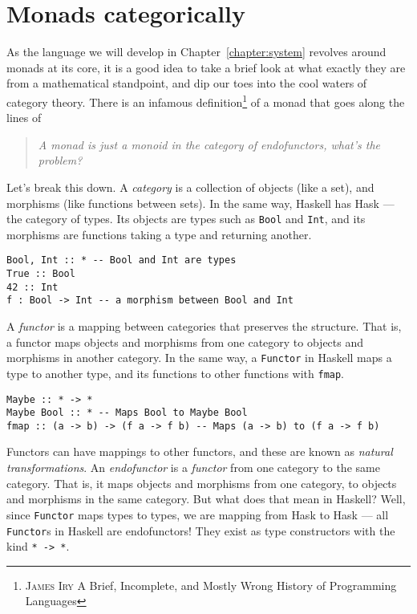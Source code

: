 \section{Monads categorically}
As the language we will develop in Chapter~\ref{chapter:system}
revolves around monads at its core, it is a good idea to take a brief
look at what exactly they are from a mathematical standpoint, and dip
our toes into the cool waters of category theory. There is an infamous
definition\footnote{\textsc{James Iry} A Brief, Incomplete, and Mostly
  Wrong History of Programming Languages} of a monad that goes along
the lines of
\begin{quote}
  \textsl{A monad is just a monoid in the category of endofunctors,
    what's the problem?}
\end{quote}
Let's break this down. A \textit{category} is a collection of objects
(like a set), and morphisms (like functions between sets). In the same
way, Haskell has \textsf{Hask} --- the category of types. Its objects
are types such as \texttt{Bool} and
\texttt{Int}, and its morphisms are functions taking a
type and returning another.
\begin{verbatim}
Bool, Int :: * -- Bool and Int are types
True :: Bool
42 :: Int
f : Bool -> Int -- a morphism between Bool and Int
\end{verbatim}
A \textit{functor} is a mapping between categories that
preserves the structure. That is, a functor maps objects and morphisms
from one category to objects and morphisms in another category.
In the same way, a \texttt{Functor} in Haskell maps a
type to another type, and its functions to other functions with
\texttt{fmap}. 
\begin{verbatim}
Maybe :: * -> *
Maybe Bool :: * -- Maps Bool to Maybe Bool
fmap :: (a -> b) -> (f a -> f b) -- Maps (a -> b) to (f a -> f b)
\end{verbatim}
Functors can have mappings to other functors, and these are known as
\emph{natural transformations}.
An \textit{endofunctor} is a \textit{functor} from one category to the
same category. That is, it maps objects and morphisms from one
category, to objects and morphisms in the same category. But what does
that mean in Haskell? Well, since \texttt{Functor} maps
types to types, we are mapping from \textsf{Hask} to \textsf{Hask} ---
all \texttt{Functor}s in Haskell are endofunctors! They
exist as type constructors with the kind \texttt{* -> *}.


